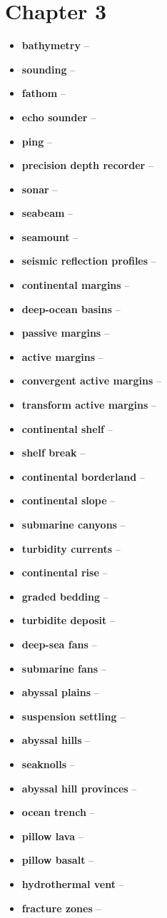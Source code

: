 \section{Chapter 3}
\begin{itemize}
	\item \textbf{bathymetry} --
	\item \textbf{sounding} --
	\item \textbf{fathom} --
	\item \textbf{echo sounder} --
	\item \textbf{ping} --
	\item \textbf{precision depth recorder} --
	\item \textbf{sonar} --
	\item \textbf{seabeam} --
	\item \textbf{seamount} --
	\item \textbf{seismic reflection profiles} --
	\item \textbf{continental margins} --
	\item \textbf{deep-ocean basins} --
	\item \textbf{passive margins} --
	\item \textbf{active margins} --
	\item \textbf{convergent active margins} --
	\item \textbf{transform active margins} --
	\item \textbf{continental shelf} --
	\item \textbf{shelf break} --
	\item \textbf{continental borderland} --
	\item \textbf{continental slope} --
	\item \textbf{submarine canyons} --
	\item \textbf{turbidity currents} --
	\item \textbf{continental rise} --
	\item \textbf{graded bedding} --
	\item \textbf{turbidite deposit} --
	\item \textbf{deep-sea fans} --
	\item \textbf{submarine fans} --
	\item \textbf{abyssal plains} --
	\item \textbf{suspension settling} --
	\item \textbf{abyssal hills} --
	\item \textbf{seaknolls} --
	\item \textbf{abyssal hill provinces} --
	\item \textbf{ocean trench} --
	\item \textbf{pillow lava} --
	\item \textbf{pillow basalt} --
	\item \textbf{hydrothermal vent} --
	\item \textbf{fracture zones} --
\end{itemize}
